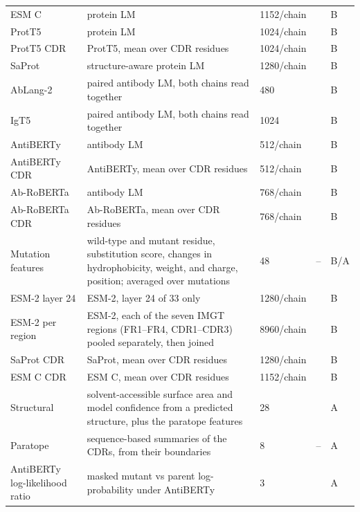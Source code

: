 {\begin{longtable}{P{2.8cm}P{4.6cm}P{2.0cm}P{1.5cm}P{1.4cm}}
ESM C & protein LM & 1152/chain & \citep{Candido2026} & B \\
ProtT5 & protein LM & 1024/chain & \citep{Elnaggar2022} & B \\
ProtT5 CDR & ProtT5, mean over CDR residues & 1024/chain & \citep{Elnaggar2022} & B \\
SaProt & structure-aware protein LM & 1280/chain & \citep{Su2023SaProt} & B \\
AbLang-2 & paired antibody LM, both chains read together & 480 & \citep{Olsen2024} & B \\
IgT5 & paired antibody LM, both chains read together & 1024 & \citep{Kenlay2024} & B \\
AntiBERTy & antibody LM & 512/chain & \citep{Ruffolo2021AntiBERTy} & B \\
AntiBERTy CDR & AntiBERTy, mean over CDR residues & 512/chain & \citep{Ruffolo2021AntiBERTy} & B \\
Ab-RoBERTa & antibody LM & 768/chain & \citep{Huh2025} & B \\
Ab-RoBERTa CDR & Ab-RoBERTa, mean over CDR residues & 768/chain & \citep{Huh2025} & B \\
Mutation features & wild-type and mutant residue, substitution score, changes in hydrophobicity, weight, and charge, position; averaged over mutations & 48 & -- & B/A \\

ESM-2 layer 24 & ESM-2, layer 24 of 33 only & 1280/chain & \citep{Lin2023} & B \\
ESM-2 per region & ESM-2, each of the seven IMGT regions (FR1--FR4, CDR1--CDR3) pooled separately, then joined & 8960/chain & \citep{Lin2023} & B \\
SaProt CDR & SaProt, mean over CDR residues & 1280/chain & \citep{Su2023SaProt} & B \\
ESM C CDR & ESM C, mean over CDR residues & 1152/chain & \citep{Candido2026} & B \\
Structural & solvent-accessible surface area and model confidence from a predicted structure, plus the paratope features & 28 & \citep{Abanades2023} & A \\
Paratope & sequence-based summaries of the CDRs, from their boundaries & 8 & -- & A \\
AntiBERTy log-likelihood ratio & masked mutant vs parent log-probability under AntiBERTy & 3 & \citep{Ruffolo2021AntiBERTy} & A \\
\end{longtable}}

